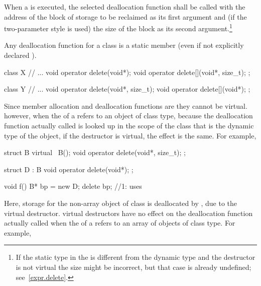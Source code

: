 \pnum
When a
is executed, the selected deallocation function shall be called with
the address of the block of storage to be reclaimed as its first argument and
(if the two-parameter style is used) the size of the block as its second
argument.\footnote{If the static type in the 
is different from
the dynamic type and the destructor is not virtual the size might be
incorrect, but that case is already undefined; see~\ref{expr.delete}.
}

\pnum
{}%
Any deallocation function for a class
is a static member (even if not explicitly declared
).
%
\enterexample

\begin{codeblock}
class X {
    // ...
    void operator delete(void*);
    void operator delete[](void*, size_t);
};

class Y {
    // ...
    void operator delete(void*, size_t);
    void operator delete[](void*);
};
\end{codeblock}
\exitexampleb

\pnum
Since member allocation and deallocation functions are
they cannot be virtual.
\enternote
{}%
%
however, when the
of a
refers to an object of class type,
because the deallocation function actually called is looked up in the scope of
the class that is the dynamic type of the object,
if the destructor is virtual, the effect is the same.
For example,

\begin{codeblock}
struct B {
    virtual ~B();
    void operator delete(void*, size_t);
};

struct D : B {
    void operator delete(void*);
};

void f()
{
    B* bp = new D;
    delete bp;			//1: uses 
}
\end{codeblock}

Here, storage for the non-array object of class
is deallocated by
,
due to the virtual destructor.
\exitnote
\enternote
virtual destructors have no effect on the deallocation function actually
called when the
of a
refers to an array of objects of class type.
For example,

